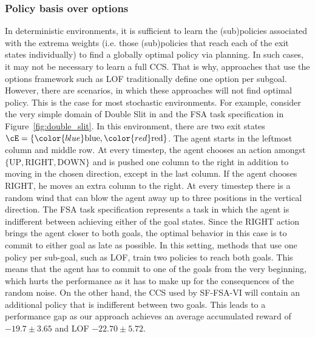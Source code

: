 \subsubsection{Policy basis over options} In deterministic environments, it is sufficient to learn the (sub)policies associated with the extrema weights (i.e. those (sub)policies that reach each of the exit states individually) to find a globally optimal policy via planning. In such cases, it may not be necessary to learn a full CCS. That is why, approaches that use the options framework such as LOF traditionally define one option per subgoal. However, there are scenarios, in which these approaches will not find optimal policy. This is the case for most stochastic environments. For example, consider the very simple domain of Double Slit in and the FSA task specification in Figure~\ref{fig:double_slit}. In this environment, there are two exit states $\cE=\{{\color{blue} \text{blue}}, {\color{red}\text{red}}\}$. The agent starts in the leftmost column and middle row. At every timestep, the agent chooses an action amongst $\{\text{UP}, \text{RIGHT}, \text{DOWN}\}$ and is pushed one column to the right in addition to moving in the chosen direction, except in the last column. If the agent chooses RIGHT, he moves an extra column to the right. At every timestep there is a random wind that can blow the agent away up to three positions in the vertical direction. The FSA task specification represents a task in which the agent is indifferent between achieving either of the goal states. Since the RIGHT action brings the agent closer to both goals, the optimal behavior in this case is to commit to either goal as late as possible. In this setting, methods that use one policy per sub-goal, such as LOF, train two policies to reach both goals. This means that the agent has to commit to one of the goals from the very beginning, which hurts the performance as it has to make up for the consequences of the random noise. On the other hand, the CCS used by SF-FSA-VI will contain an additional policy that is indifferent between two goals. This leads to a performance gap as our approach achieves an average accumulated reward of $-19.7\pm3.65$ and LOF $-22.70\pm 5.72$.

%     
%     

